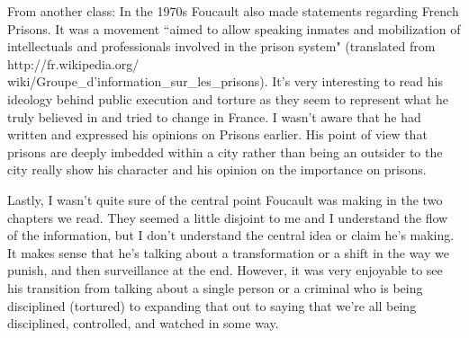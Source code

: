 \documentclass[11pt, oneside]{article}
\begin{document}
\par From another class: In the 1970s Foucault also made statements regarding French Prisons. It was a movement ``aimed to allow speaking inmates and mobilization of intellectuals and professionals involved in the prison system" (translated from http://fr.wikipedia.org/\\wiki/Groupe\_d'information\_sur\_les\_prisons). It's very interesting to read his ideology behind public execution and torture as they seem to represent what he truly believed in and tried to change in France. I wasn't aware that he had written and expressed his opinions on Prisons earlier. His point of view that prisons are deeply imbedded within a city rather than being an outsider to the city really show his character and his opinion on the importance on prisons. 

\par Lastly, I wasn't quite sure of the central point Foucault was making in the two chapters we read. They seemed a little disjoint to me and I understand the flow of the information, but I don't understand the central idea or claim he's making. It makes sense that he's talking about a transformation or a shift in the way we punish, and then surveillance at the end. However, it was very enjoyable to see his transition from talking about a single person or a criminal who is being disciplined (tortured) to expanding that out to saying that we're all being disciplined, controlled, and watched in some way.
\end{document}
